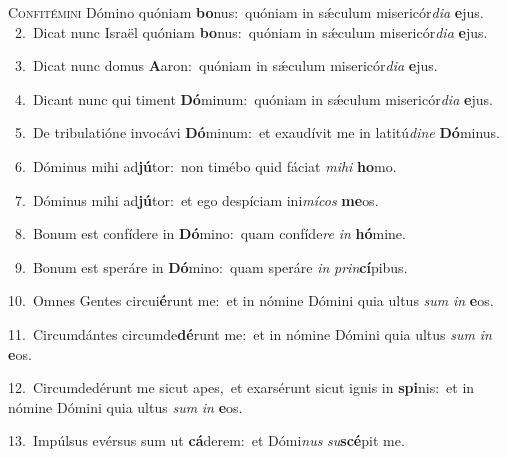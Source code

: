 \lettrine{\initial\textcolor{\initialcolor}{C}}{onfitémini} Dómino quóniam \textbf{bo}\-nus:~\star quóniam in sǽculum misericór\-\textit{di}\-\textit{a} \textbf{e}\-jus.\\
{\numbfont\textcolor{\numbcolor}{~2.}}~Dicat nunc Israël quóniam \textbf{bo}\-nus:~\star quóniam in sǽculum misericór\-\textit{di}\-\textit{a} \textbf{e}\-jus.\par
{\numbfont\textcolor{\numbcolor}{~3.}}~Dicat nunc domus \textbf{A}\-aron:~\star quóniam in sǽculum misericór\-\textit{di}\-\textit{a} \textbf{e}\-jus.\par
{\numbfont\textcolor{\numbcolor}{~4.}}~Dicant nunc qui timent \textbf{Dó}\-minum:~\star quóniam in sǽculum misericór\-\textit{di}\-\textit{a} \textbf{e}\-jus.\par
{\numbfont\textcolor{\numbcolor}{~5.}}~De tribulatióne invocávi \textbf{Dó}\-minum:~\star et exaudívit me in latitú\-\textit{di}\-\textit{ne} \textbf{Dó}\-minus.\par
{\numbfont\textcolor{\numbcolor}{~6.}}~Dóminus mihi ad\-\textbf{jú}\-tor:~\star non timébo quid fáciat \textit{mi}\-\textit{hi} \textbf{ho}\-mo.\par
{\numbfont\textcolor{\numbcolor}{~7.}}~Dóminus mihi ad\-\textbf{jú}\-tor:~\star et ego despíciam ini\-\textit{mí}\-\textit{cos} \textbf{me}\-os.\par
{\numbfont\textcolor{\numbcolor}{~8.}}~Bonum est confídere in \textbf{Dó}\-mino:~\star quam confíde\textit{re} \textit{in} \textbf{hó}\-mine.\par
{\numbfont\textcolor{\numbcolor}{~9.}}~Bonum est speráre in \textbf{Dó}\-mino:~\star quam speráre \textit{in} \textit{prin}\-\textbf{cí}pibus.\par
{\numbfont\textcolor{\numbcolor}{10.}}~Omnes Gentes circui\-\textbf{é}\-runt me:~\star et in nómine Dómini quia ultus \textit{sum} \textit{in} \textbf{e}\-os.\par
{\numbfont\textcolor{\numbcolor}{11.}}~Circumdántes circumde\-\textbf{dé}\-runt me:~\star et in nómine Dómini quia ultus \textit{sum} \textit{in} \textbf{e}\-os.\par
{\numbfont\textcolor{\numbcolor}{12.}}~Circumdedérunt me sicut apes,~\dagger et exarsérunt sicut ignis in \textbf{spi}\-nis:~\star et in nómine Dómini quia ultus \textit{sum} \textit{in} \textbf{e}\-os.\par
{\numbfont\textcolor{\numbcolor}{13.}}~Impúlsus evérsus sum ut \textbf{cá}\-derem:~\star et Dómi\textit{nus} \textit{su}\-\textbf{scé}pit me.\par
